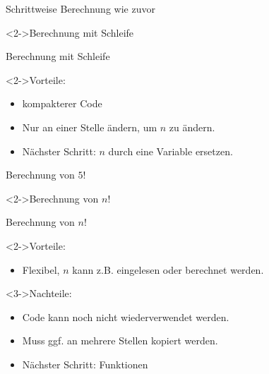 \begin{fframe}
    \begin{block}{Schrittweise Berechnung wie zuvor}
        \stepwisefactorial
    \end{block}
    \begin{block}<2->{Berechnung mit Schleife}
        \loopfactorial
    \end{block}
\end{fframe}

\begin{fframe}
    \begin{block}{Berechnung mit Schleife}
        \loopfactorial
    \end{block}
    \begin{block}<2->{Vorteile:}
        \begin{itemize}
            \item kompakterer Code
            \item Nur an einer Stelle ändern, um $n$ zu ändern.
            \item Nächster Schritt: $n$ durch eine Variable ersetzen.
        \end{itemize}
    \end{block}
\end{fframe}

\begin{fframe}
    \begin{block}{Berechnung von $5!$}
        \loopfactorial
    \end{block}
    \begin{block}<2->{Berechnung von $n!$}
        \loopgeneralized
    \end{block}
\end{fframe}

\begin{fframe}
    \begin{block}{Berechnung von $n!$}
        \loopgeneralized
    \end{block}
    \begin{block}<2->{Vorteile:}
        \begin{itemize}
            \item Flexibel, $n$ kann z.B. eingelesen oder berechnet werden.
        \end{itemize}
    \end{block}
    \begin{block}<3->{Nachteile:}
        \begin{itemize}
            \item Code kann noch nicht wiederverwendet werden.
            \item Muss ggf. an mehrere Stellen kopiert werden.
            \item<4-> Nächster Schritt: Funktionen
        \end{itemize}
    \end{block}
\end{fframe}

